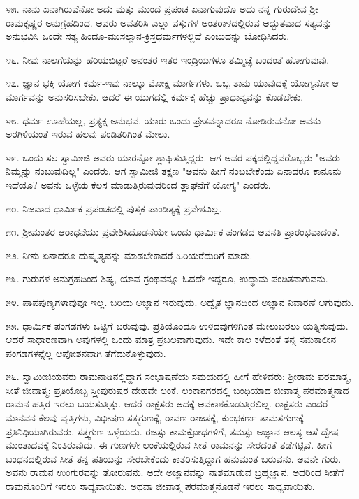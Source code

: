 ೪೫. ನಾನು ಏನಾಗಿರುವೆನೋ ಅದು ಮತ್ತು ಮುಂದೆ ಪ್ರಪಂಚ ಏನಾಗುವುದೊ ಅದು ನನ್ನ ಗುರುದೇವ ಶ‍್ರೀ ರಾಮಕೃಷ್ಣರ ಅನುಗ್ರಹದಿಂದ. ಅವರು ಅವತರಿಸಿ ಎಲ್ಲಾ ವಸ್ತುಗಳ ಅಂತರಾಳದಲ್ಲಿರುವ ಅದ್ಭುತವಾದ ಸತ್ಯವನ್ನು ಅನುಭವಿಸಿ ಒಂದೇ ಸತ್ಯ ಹಿಂದೂ-ಮುಸಲ್ಮಾನ-ಕ್ರಿಸ್ತಧರ್ಮಗಳಲ್ಲಿದೆ ಎಂಬುದನ್ನು ಬೋಧಿಸಿದರು.

೪೬. ನೀವು ನಾಲಗೆಯನ್ನು ಹರಿಯಬಿಟ್ಟರೆ ಅನಂತರ ಇತರ ಇಂದ್ರಿಯಗಳೂ ತಮ್ಮಿಚ್ಛೆ ಬಂದಂತೆ ಹೋಗುವುವು.

೪೭. ಜ್ಞಾನ ಭಕ್ತಿ ಯೋಗ ಕರ್ಮ-ಇವು ನಾಲ್ಕೂ ಮೋಕ್ಷ ಮಾರ್ಗಗಳು. ಒಬ್ಬ ತಾನು ಯಾವುದಕ್ಕೆ ಯೋಗ್ಯನೋ ಆ ಮಾರ್ಗವನ್ನು ಅನುಸರಿಸಬೇಕು. ಆದರೆ ಈ ಯುಗದಲ್ಲಿ ಕರ್ಮಕ್ಕೆ ಹೆಚ್ಚು ಪ್ರಾಧಾನ್ಯವನ್ನು ಕೊಡಬೇಕು.

೪೮. ಧರ್ಮ ಊಹೆಯಲ್ಲ, ಪ್ರತ್ಯಕ್ಷ ಅನುಭವ. ಯಾರು ಒಂದು ಪ್ರೇತವನ್ನಾದರೂ ನೋಡಿರುವನೋ ಅವನು ಅರಗಿಳಿಯಂತೆ ಇರುವ ಹಲವು ಪಂಡಿತರಿಗಿಂತ ಮೇಲು.

೪೯. ಒಂದು ಸಲ ಸ್ವಾಮೀಜಿ ಅವರು ಯಾರನ್ನೋ ಶ್ಲಾಘಿಸುತ್ತಿದ್ದರು. ಆಗ ಅವರ ಪಕ್ಕದಲ್ಲಿದ್ದವರೊಬ್ಬರು "ಅವರು ನಿಮ್ಮನ್ನು ನಂಬುವುದಿಲ್ಲ" ಎಂದರು. ಆಗ ಸ್ವಾಮೀಜಿ ತಕ್ಷಣ "ಅವನು ಹೀಗೆ ನಂಬಬೇಕೆಂದು ಏನಾದರೂ ಕಾನೂನು ಇದೆಯೊ? ಅವನು ಒಳ್ಳೆಯ ಕೆಲಸ ಮಾಡುತ್ತಿರುವುದರಿಂದ ಶ್ಲಾಘನೆಗೆ ಯೋಗ್ಯ" ಎಂದರು.

೫೦. ನಿಜವಾದ ಧಾರ್ಮಿಕ ಪ್ರಪಂಚದಲ್ಲಿ ಪುಸ್ತಕ ಪಾಂಡಿತ್ಯಕ್ಕೆ ಪ್ರವೇಶವಿಲ್ಲ.

೫೧. ಶ‍್ರೀಮಂತರ ಆರಾಧನೆಯು ಪ್ರವೇಶಿಸಿದೊಡನೆಯೇ ಒಂದು ಧಾರ್ಮಿಕ ಪಂಗಡದ ಅವನತಿ ಪ್ರಾರಂಭವಾದಂತೆ.

೫೨. ನೀನು ಏನಾದರೂ ದುಷ್ಕೃತ್ಯವನ್ನು ಮಾಡಬೇಕಾದರೆ ಹಿರಿಯರೆದುರಿಗೆ ಮಾಡು.

೫೩. ಗುರುಗಳ ಅನುಗ್ರಹದಿಂದ ಶಿಷ್ಯ, ಯಾವ ಗ್ರಂಥವನ್ನೂ ಓದದೇ ಇದ್ದರೂ, ಉದ್ಧಾಮ ಪಂಡಿತನಾಗುವನು.

೫೪. ಪಾಪಪುಣ್ಯಗಳಾವುವೂ ಇಲ್ಲ. ಬರಿಯ ಅಜ್ಞಾನ ಇರುವುದು. ಅದ್ವೈತ ಜ್ಞಾನದಿಂದ ಅಜ್ಞಾನ ನಿವಾರಣೆ ಆಗುವುದು.

೫೫. ಧಾರ್ಮಿಕ ಪಂಗಡಗಳು ಒಟ್ಟಿಗೆ ಬರುವುವು. ಪ್ರತಿಯೊಂದೂ ಉಳಿದವುಗಳಿಗಿಂತ ಮೇಲುಬರಲು ಯತ್ನಿಸುವುದು. ಆದರೆ ಸಾಧಾರಣವಾಗಿ ಅವುಗಳಲ್ಲಿ ಒಂದು ಮಾತ್ರ ಪ್ರಬಲವಾಗುವುದು. ಇದೇ ಕಾಲ ಕಳೆದಂತೆ ತನ್ನ ಸಮಕಾಲೀನ ಪಂಗಡಗಳನ್ನೆಲ್ಲ ಆಪೋಶನವಾಗಿ ತೆಗೆದುಕೊಳ್ಳುವುದು.

೫೬. ಸ್ವಾಮೀಜಿಯವರು ರಾಮನಾಡಿನಲ್ಲಿದ್ದಾಗ ಸಂಭಾಷಣೆಯ ಸಮಯದಲ್ಲಿ ಹೀಗೆ ಹೇಳಿದರು: ಶ‍್ರೀರಾಮ ಪರಮಾತ್ಮ, ಸೀತೆ ಜೀವಾತ್ಮ; ಪ್ರತಿಯೊಬ್ಬ ಸ್ತ್ರೀಪುರುಷರ ದೇಹವೇ ಲಂಕೆ. ಲಂಕಾನಗರದಲ್ಲಿ ಬಂಧಿಯಾದ ಜೀವಾತ್ಮ ಪರಮಾತ್ಮನಾದ ರಾಮನ ಹತ್ತಿರ ಇರಲು ಬಯಸುತ್ತಿತ್ತು. ಆದರೆ ರಾಕ್ಷಸರು ಅದಕ್ಕೆ ಅವಕಾಶಕೊಡುತ್ತಿರಲಿಲ್ಲ. ರಾಕ್ಷಸರು ಎಂದರೆ ಮಾನವನ ಕೆಲವು ವೃತ್ತಿಗಳು, ವಿಭೀಷಣ ಸತ್ತ್ವಗುಣಕ್ಕೆ, ರಾವಣ ರಾಜಸಕ್ಕೆ, ಕುಂಭಕರ್ಣ ತಾಮಸಗುಣಕ್ಕೆ ಪ್ರತಿನಿಧಿಯಾಗಿರುವರು. ಸತ್ತ್ವಗುಣ ಒಳ್ಳೆಯದು. ರಜಸ್ಸು ಕಾಮಕ್ರೋಧಗಳಿಗೆ, ತಮಸ್ಸು ಅಜ್ಞಾನ ಆಲಸ್ಯ ಆಸೆ ದ್ವೇಷ ಮುಂತಾದವಕ್ಕೆ ನಿಂತಿರುವುದು. ಈ ಗುಣಗಳೇ ಲಂಕೆಯಲ್ಲಿರುವ ಸೀತೆ ರಾಮನನ್ನು ಸೇರದಂತೆ ತಡೆಗಟ್ಟಿವೆ. ಹೀಗೆ ಬಂಧನದಲ್ಲಿರುವ ಸೀತೆ ತನ್ನ ಪತಿಯನ್ನು ಸೇರಬೇಕೆಂದು ಕಾತರಿಸುತ್ತಿದ್ದಾಗ ಹನುಮಂತ ಬರುವನು. ಅವನೇ ಗುರು. ಅವನು ರಾಮನ ಉಂಗುರವನ್ನು ತೋರುವನು. ಅದೇ ಅಜ್ಞಾನವನ್ನು ನಾಶಮಾಡುವ ಬ್ರಹ್ಮಜ್ಞಾನ. ಅದರಿಂದ ಸೀತೆಗೆ ರಾಮನೊಂದಿಗೆ ಇರಲು ಸಾಧ್ಯವಾಯಿತು. ಅಥವಾ ಜೀವಾತ್ಮ ಪರಮಾತ್ಮನೊಡನೆ ಇರಲು ಸಾಧ್ಯವಾಯಿತು.

